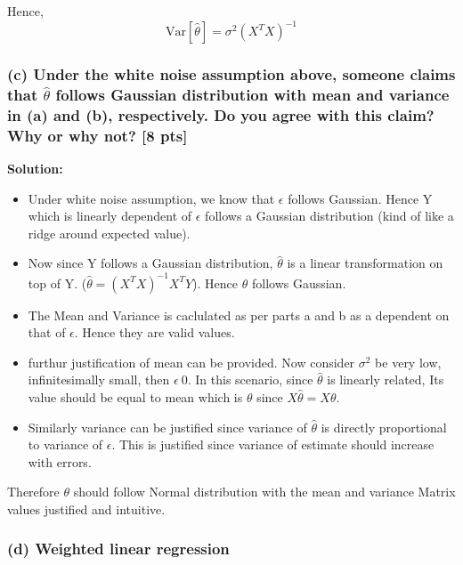 \documentclass[twoside,10pt]{article}
\begin{document}
Hence,
$$\boxed{\text{Var}[\hat{\theta}] = \sigma^2 (X^T X)^{-1}}$$



\subsubsection*{(c) Under the white noise assumption above, someone claims that $\hat{\theta}$ follows Gaussian
distribution with mean and variance in (a) and (b), respectively. Do
you agree with this claim? Why or why not? [8 pts]}
\textbf{ Solution: }
\begin{itemize}
	\item Under white noise assumption, we know that $\epsilon$ follows Gaussian. Hence Y which is linearly dependent of $\epsilon$ follows a Gaussian distribution (kind of like a ridge around expected value).
    \item Now since Y follows a Gaussian distribution, $\hat{\theta}$ is a linear transformation on top of Y. ($\hat{\theta} = (X^T X)^{-1} X^T Y$). Hence $\hat{\theta}$ follows Gaussian.
    \item The Mean and Variance is caclulated as per parts a and b as a dependent on that of $\epsilon$. Hence they are valid values.
    \item furthur justification of mean can be provided. Now consider $\sigma^2$ be very low, infinitesimally small, then $\epsilon ~ 0$. In this scenario, since $\hat{\theta}$ is linearly related, Its value should be equal to mean which is $\theta$ since $X\hat{\theta} = X\theta$.
    \item Similarly variance can be justified since variance of $\hat{\theta}$ is directly proportional to variance of $\epsilon$. This is justified since variance of estimate should increase with errors. 
\end{itemize}
Therefore $\theta$ should follow Normal distribution with the mean and variance Matrix values justified and intuitive.


\newpage

\subsubsection*{(d) Weighted linear regression}
\end{document}
